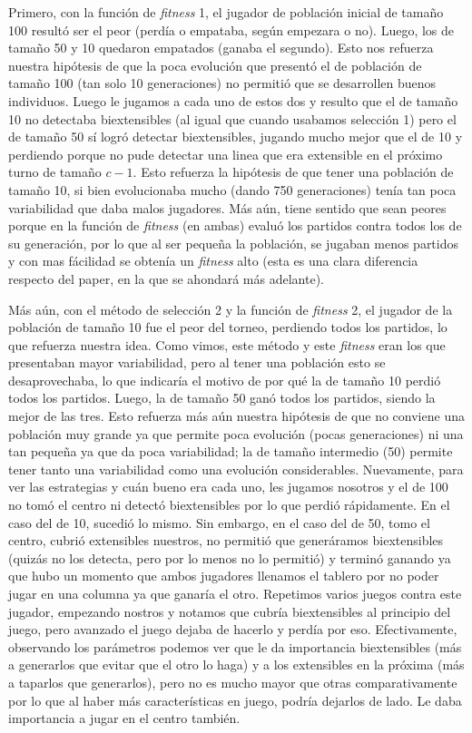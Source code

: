 \documentclass[A4paper,oneside,fleqn,11pt]{article}
\theoremstyle{definition}
\begin{document}
Primero, con la función de \textit{fitness} 1, el jugador de población inicial de tamaño 100 resultó ser el peor (perdía o empataba, según empezara o no). Luego, los de tamaño 50 y 10 quedaron empatados (ganaba el segundo). Esto nos refuerza nuestra hipótesis de que la poca evolución que presentó el de población de tamaño 100 (tan solo 10 generaciones) no permitió que se desarrollen buenos individuos. Luego le jugamos a cada uno de estos dos y resulto que el de tamaño 10 no detectaba biextensibles (al igual que cuando usabamos selección 1) pero el de tamaño 50 sí logró detectar biextensibles, jugando mucho mejor que el de 10 y perdiendo porque no pude detectar una linea que era extensible en el próximo turno de tamaño $c-1$. Esto refuerza la hipótesis de que tener una población de tamaño 10, si bien evolucionaba mucho (dando 750 generaciones) tenía tan poca variabilidad que daba malos jugadores. Más aún, tiene sentido que sean peores porque en la función de \textit{fitness} (en ambas) evaluó los partidos contra todos los de su generación, por lo que al ser pequeña la población, se jugaban menos partidos y con mas fácilidad se obtenía un \textit{fitness} alto (esta es una clara diferencia respecto del paper, en la que se ahondará más adelante). 

Más aún, con el método de selección 2 y la función de \textit{fitness} 2, el jugador de la población de tamaño 10 fue el peor del torneo, perdiendo todos los partidos, lo que refuerza nuestra idea. Como vimos, este método y este \textit{fitness} eran los que presentaban mayor variabilidad, pero al tener una población esto se desaprovechaba, lo que indicaría el motivo de por qué la de tamaño 10 perdió todos los partidos. Luego, la de tamaño 50 ganó todos los partidos, siendo la mejor de las tres. Esto refuerza más aún nuestra hipótesis de que no conviene una población muy grande ya que permite poca evolución (pocas generaciones) ni una tan pequeña ya que da poca variabilidad; la de tamaño intermedio (50) permite tener tanto una variabilidad como una evolución considerables. Nuevamente, para ver las estrategias y cuán bueno era cada uno, les jugamos nosotros y el de 100 no tomó el centro ni detectó biextensibles por lo que perdió rápidamente. En el caso del de 10, sucedió lo mismo. Sin embargo, en el caso del de 50, tomo el centro, cubrió extensibles nuestros, no permitió que generáramos biextensibles (quizás no los detecta, pero por lo menos no lo permitió) y terminó ganando ya que hubo un momento que ambos jugadores llenamos el tablero por no poder jugar en una columna ya que ganaría el otro. Repetimos varios juegos contra este jugador, empezando nostros y notamos que cubría biextensibles al principio del juego, pero avanzado el juego dejaba de hacerlo y perdía por eso. Efectivamente, observando los parámetros podemos ver que le da importancia biextensibles (más a generarlos que evitar que el otro lo haga) y a los extensibles en la próxima (más a taparlos que generarlos), pero no es mucho mayor que otras comparativamente por lo que al haber más características en juego, podría dejarlos de lado. Le daba importancia a jugar en el centro también.
\end{document}
